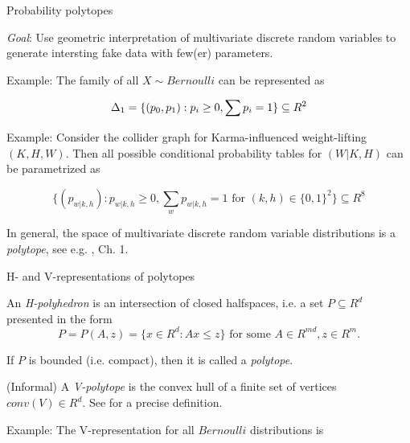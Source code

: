 \begin{frame}{Probability polytopes}

  \emph{Goal}: Use geometric interpretation of multivariate discrete random variables to generate intersting fake data with few(er) parameters.\newline

  Example: The family of all $X \sim Bernoulli$ can be represented as

  \begin{equation*}
    \Delta_1 = \{(p_0, p_1): p_i \geq 0, \sum p_i = 1\} \subseteq R^2\newline
  \end{equation*}

  Example: Consider the collider graph for Karma-influenced weight-lifting $(K, H, W)$. Then all possible conditional probability tables for $(W | K, H)$ can be parametrized as

  \begin{equation*}
    \{(p_{w | k, h}): p_{w | k, h} \geq 0, \sum_w p_{w  | k,h} = 1 \textrm{ for } (k, h) \in \{0, 1\}^2\} \subseteq R^8
  \end{equation*}

  In general, the space of multivariate discrete random variable distributions is a \emph{polytope}, see e.g. \cite{drton2008lectures}, Ch. 1.
\end{frame}


\begin{frame}{H- and V-representations of polytopes}

  \begin{definition}
    An \emph{H-polyhedron} is an intersection of closed halfspaces, i.e. a set $P \subseteq R^d$ presented in the form
    \begin{equation*}
      P = P(A,z)=\{ x \in R^d: Ax \leq z\} \textrm{ for some } A \in R^{m d}, z \in R^m.
    \end{equation*}
  \end{definition}

  If $P$ is bounded (i.e. compact), then it is called a \emph{polytope}.

  \begin{definition}
    (Informal) A \emph{V-polytope} is the convex hull of a finite set of vertices $conv(V) \in R^d$. See \cite{ziegler2012lectures} for a precise definition.
  \end{definition}

  Example: The V-representation for all $Bernoulli$ distributions is
\end{frame}


